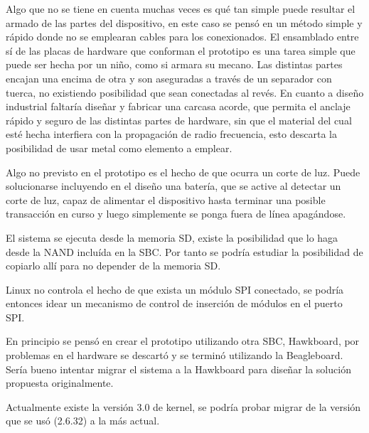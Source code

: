 \bigskip
Algo que no se tiene en cuenta muchas veces es qué tan simple puede resultar
el armado de las partes del dispositivo, en este caso se pensó en un 
método simple y rápido donde no se emplearan cables para los conexionados.
El ensamblado entre sí de las placas de hardware que conforman el prototipo es 
una tarea simple que puede ser hecha por un niño, como si armara su mecano.
Las distintas partes encajan una encima de otra y son aseguradas a través
de un separador con tuerca, no existiendo posibilidad que sean conectadas al 
revés. En cuanto a diseño industrial faltaría diseñar y fabricar una 
carcasa acorde, que permita el anclaje rápido y seguro de las distintas
partes de hardware, sin que el material del cual esté hecha interfiera
con la propagación de radio frecuencia, esto descarta la posibilidad de
usar metal como elemento a emplear.

\bigskip
Algo no previsto en el prototipo es el hecho de que ocurra un corte de luz. Puede solucionarse incluyendo en el diseño una batería, que se active al detectar un corte de luz, capaz de alimentar el dispositivo hasta terminar una posible transacción en curso y luego simplemente se ponga fuera de línea apagándose.

\bigskip
El sistema se ejecuta desde la memoria SD, existe la posibilidad que lo haga desde la NAND incluída en la SBC. Por tanto se podría estudiar la posibilidad de copiarlo allí para no depender de la memoria SD.

\bigskip
Linux no controla el hecho de que exista un módulo SPI conectado, se podría entonces idear un mecanismo de control de inserción de módulos en el puerto SPI.

\bigskip
En principio se pensó en crear el prototipo utilizando otra SBC, Hawkboard, por problemas en el hardware se descartó y se terminó utilizando la Beagleboard. Sería bueno intentar migrar el sistema a la Hawkboard para diseñar la solución propuesta originalmente.

\bigskip
Actualmente existe la versión 3.0 de kernel, se podría probar migrar de la versión que se usó (2.6.32) a la más actual.



